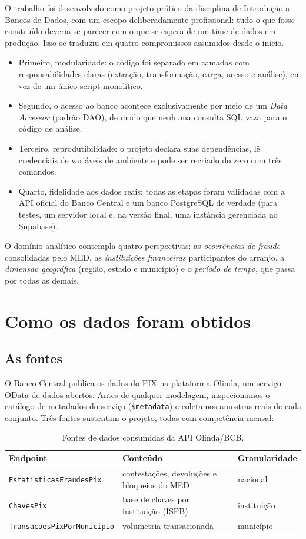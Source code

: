 \documentclass[12pt,a4paper]{article}
\newcommand{\code}[1]{\texttt{#1}}
\begin{document}
O trabalho foi desenvolvido como projeto prático da disciplina de Introdução
a Bancos de Dados, com um escopo deliberadamente profissional: tudo o que
fosse construído deveria se parecer com o que se espera de um time de dados
em produção. Isso se traduziu em quatro compromissos assumidos desde o
início.
\begin{itemize}
    \item Primeiro, modularidade: o código foi separado em camadas com responsabilidades claras (extração, transformação, carga, acesso e análise), em vez de um único script monolítico.
    \item Segundo, o acesso ao banco acontece exclusivamente por meio de um \emph{Data Accessor} (padrão DAO), de modo que nenhuma consulta SQL vaza para o código de análise. 
    \item Terceiro, reprodutibilidade: o projeto declara suas dependências, lê credenciais de variáveis de ambiente e pode ser recriado do zero com três comandos.
    \item Quarto, fidelidade aos dados reais: todas as etapas foram validadas com a API oficial do Banco Central e um banco PostgreSQL de verdade (para testes, um servidor local e, na versão final, uma instância gerenciada no Supabase).
\end{itemize}

O domínio analítico contempla quatro perspectivas: as
\emph{ocorrências de fraude} consolidadas pelo MED, as \emph{instituições
financeiras} participantes do arranjo, a \emph{dimensão geográfica}
(região, estado e município) e o \emph{período de tempo}, que passa por todas
as demais.

\section{Como os dados foram obtidos}

\subsection{As fontes}

O Banco Central publica os dados do PIX na plataforma Olinda, um serviço
OData de dados abertos. Antes de qualquer modelagem, inspecionamos o
catálogo de metadados do serviço (\code{\$metadata}) e coletamos amostras
reais de cada conjunto. Três fontes sustentam o projeto, todas com
competência mensal:

\begin{table}[H]
\centering\small
\begin{tabular}{lll}
\toprule
\textbf{Endpoint} & \textbf{Conteúdo} & \textbf{Granularidade} \\
\midrule
\code{EstatisticasFraudesPix} & contestações, devoluções e bloqueios do MED & nacional \\
\code{ChavesPix} & base de chaves por instituição (ISPB) & instituição \\
\code{TransacoesPixPorMunicipio} & volumetria transacionada & município \\
\bottomrule
\end{tabular}
\caption{Fontes de dados consumidas da API Olinda/BCB.}
\end{table}
\end{document}
